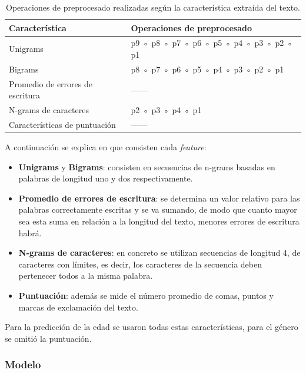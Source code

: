 \begin{table}[H]
    \centering
    \begin{tabular}{|l|l|}
        \rowcolor{udcpink!25}
        \hline
        \textbf{Característica} & \textbf{Operaciones de preprocesado} \\\hline
        Unigrams & p9 ◦ p8 ◦ p7 ◦ p6 ◦ p5 ◦ p4 ◦ p3 ◦ p2 ◦ p1 \\
        Bigrams & p8 ◦ p7 ◦ p6 ◦ p5 ◦ p4 ◦ p3 ◦ p2 ◦ p1 \\
        Promedio de errores de escritura & —— \\
        N-grams de caracteres & p2 ◦ p3 ◦ p4 ◦ p1 \\
        Características de puntuación & —— \\ \hline
    \end{tabular}%
    \caption{Operaciones de preprocesado realizadas según la característica extraída del texto.}
    \label{tab:preprocesado}
\end{table}

A continuación se explica en que consisten cada \textit{feature}:

\begin{itemize}
    \item \textbf{Unigrams} y \textbf{Bigrams}: consisten en secuencias de n-grams basadas en palabras de longitud uno y dos respectivamente.
    \item \textbf{Promedio de errores de escritura}: se determina un valor relativo para las palabras correctamente escritas y se va sumando, de modo que cuanto mayor sea esta suma en relación a la longitud del texto, menores errores de escritura habrá.
    \item \textbf{N-grams de caracteres}: en concreto se utilizan secuencias de longitud 4, de caracteres con límites, es decir, los caracteres de la secuencia deben pertenecer todos a la misma palabra.
    \item \textbf{Puntuación}: además se mide el número promedio de comas, puntos y marcas de exclamación del texto.
\end{itemize}

Para la predicción de la edad se usaron todas estas características, para el género se omitió la puntuación.

\subsubsection{Modelo}


